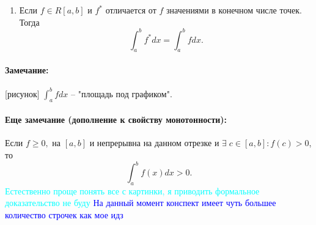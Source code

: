 \documentclass{article}
\theoremstyle{plain}
\theoremstyle{definition}
\theoremstyle{remark}
\begin{document}
\begin{enumerate}
    \begin{proof}
    Интегрируемость можно вывести через критерий Дарбу, поскольку $\omega_i(|f|) \leq \omega_i(f).$
    
    Неравенство (\ref{ineq}) получается предельным переходом из неравенсвта для интегральных сумм и следующего неравенства для конечных сумм: $$\left|\sum_{i=1}^n a_i \right| \leq \sum_{i=1}^n |a_i|.$$
    \end{proof}
    \item Если $f\in R[a, b]$ и $f^*$ отличается от  $f$ значениями в конечном числе точек. Тогда $$\int_a^b f^*dx = \int_a^b fdx.$$
    
    \end{enumerate}
    
    
  
\paragraph{Замечание:} [рисунок] $\int_a^b fdx$ -- "площадь под графиком".
\paragraph{Еще замечание (дополнение к свойству монотонности):} Если $f \geq 0,$ на $[a, b]$ и непрерывна на данном отрезке и $\exists \; c \in [a, b]: f(c) > 0$, то 
$$\int_a^b f(x)dx > 0.$$
\textcolor{cyan}{Естественно проще понять все с картинки, я приводить формальное доказательство не буду}
\textcolor{blue}{На данный момент конспект имеет чуть большее количество строчек как мое идз}
\end{document}
